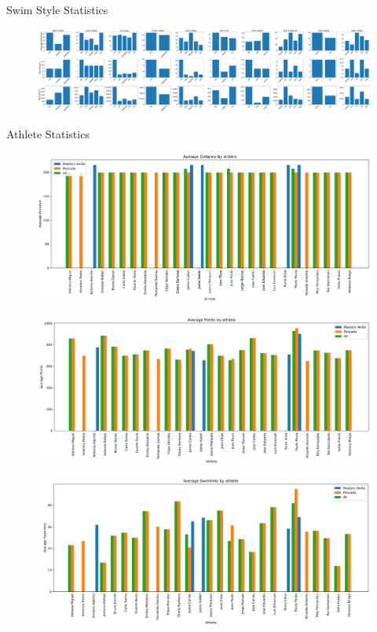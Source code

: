 \documentclass[aspectratio=169, xcolor=dvipsnames]{beamer}
\begin{document}
\begin{frame}{Swim Style Statistics}
\begin{figure}
    \centering
    \includegraphics[width=\textwidth]{img/stats_clubs_swim.pdf}
\end{figure}
\end{frame}

\begin{frame}[allowframebreaks]{Athlete Statistics}
\begin{figure}
    \centering
    \includegraphics[width=\textwidth]{img/stats/ath1.png}
\end{figure}

\begin{figure}
    \centering
    \includegraphics[width=\textwidth]{img/stats/ath2.png}
\end{figure}

\begin{figure}
    \centering
    \includegraphics[width=\textwidth]{img/stats/ath3.png}
\end{figure}

\end{frame}
\end{document}
